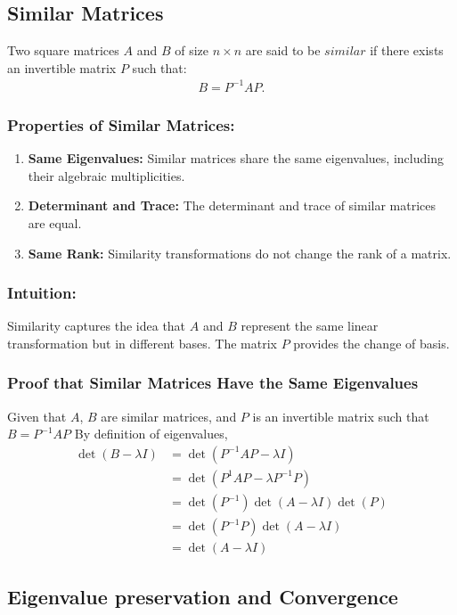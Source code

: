 \documentclass[12pt]{article}
\begin{document}
\subsection{Similar Matrices}
Two square matrices $A$ and $B$ of size $n \times n$ are said to be $similar$ if there exists an invertible matrix $P$ such that:
\begin{align*}
B = P^{-1} A P.
\end{align*}

\subsubsection{Properties of Similar Matrices:}
\begin{enumerate}
\item \textbf{Same Eigenvalues:} Similar matrices share the same eigenvalues, including their algebraic multiplicities.
\item \textbf{Determinant and Trace:} The determinant and trace of similar matrices are equal.
\item \textbf{Same Rank:} Similarity transformations do not change the rank of a matrix.
\end{enumerate}
\subsubsection{Intuition:}
Similarity captures the idea that $A$ and $B$ represent the same linear transformation but in different bases. The matrix $P$ provides the change of basis.
\subsubsection{Proof that Similar Matrices Have the Same Eigenvalues}
Given that $A$, $B$ are similar matrices, and $P$ is an invertible matrix such that $B=P^{-1}AP$
By definition of eigenvalues,
\begin{align*}
    \det(B-\lambda I)&=\det(P^{-1}AP -\lambda I)\\
    &=\det(P^{1}AP -\lambda P^{-1}P)\\
    &=\det(P^{-1})\det(A-\lambda I)\det(P)\\
    &=\det(P^{-1}P)\det(A- \lambda I)\\
    &=\det(A-\lambda I)
\end{align*}

\subsection{Eigenvalue preservation and Convergence}
\end{document}
